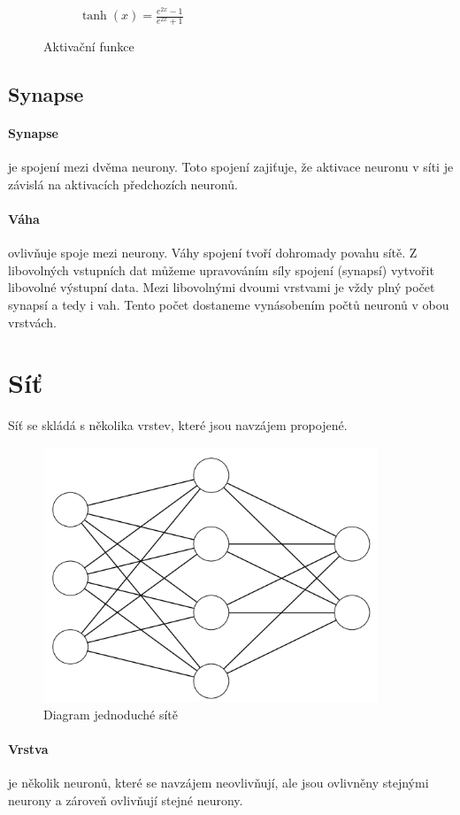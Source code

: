 \documentclass[12pt,a4paper]{report}
\begin{document}
\begin{figure}
\begin{subfigure}[h]{0.3\textwidth}
				\caption{$\tanh(x)=\frac{e^{2x}-1}{e^{2x}+1}$}
				\label{fig:hyperbolic tangent}
			\end{subfigure}
			\caption{Aktivační funkce}\label{fig:activation functions}
		\end{figure}
	\subsection{Synapse}
		\paragraph{Synapse} je spojení mezi dvěma neurony. Toto spojení zajiťuje, že aktivace neuronu v síti je závislá na aktivacích předchozích neuronů.
		\paragraph{Váha}
		ovlivňuje spoje mezi neurony. Váhy spojení tvoří dohromady povahu sítě. Z libovolných vstupních dat můžeme upravováním síly spojení (synapsí) vytvořit libovolné výstupní data. Mezi libovolnými dvoumi vrstvami je vždy plný počet synapsí a tedy i vah. Tento počet dostaneme vynásobením počtů neuronů v obou vrstvách.
\section{Síť}
	Síť se skládá s několika vrstev, které jsou navzájem propojené.
	\begin{figure}[h]
		\centering
		\includegraphics[width=10cm]{images/nn3-4-2}
		\caption{Diagram jednoduché sítě}
	\end{figure}
	\paragraph{Vrstva}
	je několik neuronů, které se navzájem neovlivňují, ale jsou ovlivněny stejnými neurony a zároveň ovlivňují stejné neurony.
\end{document}
